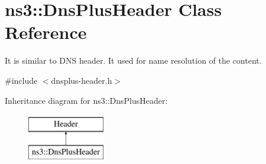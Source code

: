 \hypertarget{classns3_1_1DnsPlusHeader}{\section{ns3\-:\-:Dns\-Plus\-Header Class Reference}
\label{classns3_1_1DnsPlusHeader}
}


It is similar to D\-N\-S header. It used for name resolution of the content.  




{\ttfamily \#include $<$dnsplus-\/header.\-h$>$}

Inheritance diagram for ns3\-:\-:Dns\-Plus\-Header\-:\begin{figure}[H]
\begin{center}
\leavevmode
\includegraphics[height=2.000000cm]{classns3_1_1DnsPlusHeader}
\end{center}
\end{figure}
